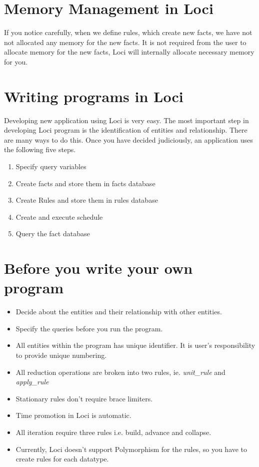\section { Memory Management in Loci }
If you notice carefully, when we define rules, which create new facts, we
have not not allocated any memory for the new facts. It is not required
from the user to allocate memory for the new facts, Loci will internally
allocate necessary memory for you. 

\section { Writing programs in Loci } 
Developing new application using Loci is very easy.  The most important 
step in developing Loci program is the identification of entities and
relationship. There are many ways to do this. Once you have decided
judiciously, an application uses the following five steps.
\begin{enumerate}
\item { Specify query variables }
\item { Create facts and store them in facts database }
\item { Create Rules and store them in rules database }
\item { Create and execute schedule}
\item { Query the fact database }
\end{enumerate}

\section { Before you write your own program}
\begin{itemize}
\item Decide about the entities and their relationship with other entities.
\item Specify the queries before you run the program.
\item All entities within the program has unique identifier. It is user's 
responsibility to provide unique numbering.  
\item All reduction operations are broken into two rules, ie. {\em unit\_rule} and 
{\em apply\_rule}
\item Stationary rules don't require brace limiters.
\item Time promotion in Loci is automatic.
\item All iteration require three rules i.e. build, advance and collapse.
\item Currently, Loci doesn't support Polymorphism for the rules, so you 
have to create rules for each datatype.
\end{itemize}


